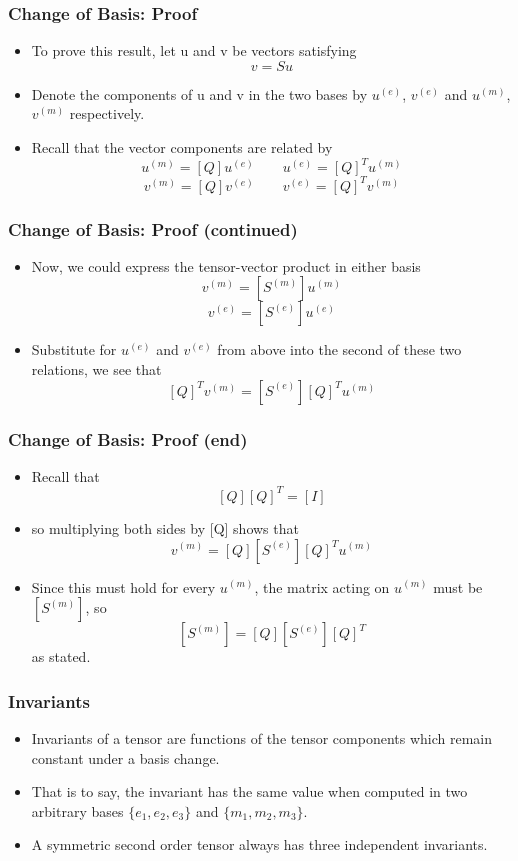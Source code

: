 \documentclass[aspectratio=169,11pt]{beamer}
\begin{document}
\begin{frame}
\frametitle{Change of Basis: Proof}
\begin{itemize}
    \item To prove this result, let u and v be vectors satisfying
    \[
    v = S u
    \]
    \item Denote the components of u and v in the two bases by \(u^{(e)}\), \(v^{(e)}\) and \(u^{(m)}\), \(v^{(m)}\) respectively.
    \item Recall that the vector components are related by
    \[
    u^{(m)} = [Q] u^{(e)} \qquad u^{(e)} = [Q]^T u^{(m)}
    \]
    \[
    v^{(m)} = [Q] v^{(e)} \qquad v^{(e)} = [Q]^T v^{(m)}
    \]
\end{itemize}
\end{frame}

\begin{frame}
\frametitle{Change of Basis: Proof (continued)}
\begin{itemize}
    \item Now, we could express the tensor-vector product in either basis
    \[
    v^{(m)} = [S^{(m)}] u^{(m)}
    \]
    \[
    v^{(e)} = [S^{(e)}] u^{(e)}
    \]
    \item Substitute for \(u^{(e)}\) and \(v^{(e)}\) from above into the second of these two relations, we see that
    \[
    [Q]^T v^{(m)} = [S^{(e)}] [Q]^T u^{(m)}
    \]
\end{itemize}
\end{frame}

\begin{frame}
\frametitle{Change of Basis: Proof (end)}
\begin{itemize}
    \item Recall that
    \[
    [Q] [Q]^T = [I]
    \]
    \item so multiplying both sides by [Q] shows that
    \[
    v^{(m)} = [Q] [S^{(e)}] [Q]^T u^{(m)}
    \]
    \item Since this must hold for every $u^{(m)}$, the matrix acting on $u^{(m)}$ must be $[S^{(m)}]$, so
    \[
    [S^{(m)}] = [Q] [S^{(e)}] [Q]^T
    \]
    as stated.
\end{itemize}
\end{frame}

\begin{frame}
\frametitle{Invariants}
\begin{itemize}
    \item Invariants of a tensor are functions of the tensor components which remain constant under a basis change.
    \item That is to say, the invariant has the same value when computed in two arbitrary bases \(\{e_1, e_2, e_3\}\) and \(\{m_1, m_2, m_3\}\).
    \item A symmetric second order tensor always has three independent invariants.
\end{itemize}
\end{frame}
\end{document}
